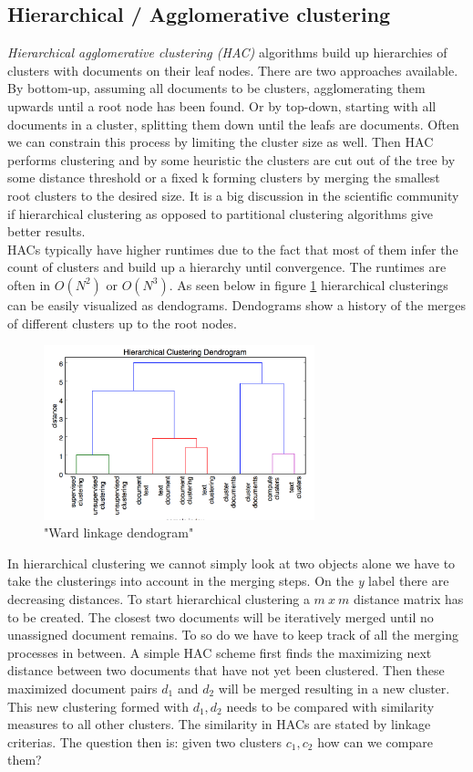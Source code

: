   \subsection{Hierarchical / Agglomerative clustering}
    \emph{Hierarchical agglomerative clustering (HAC)} algorithms build up hierarchies of clusters with  documents on their leaf nodes. There are two approaches available. By bottom-up, assuming all documents to be clusters, agglomerating them upwards until a root node has been found. Or by top-down, starting with all documents in a cluster, splitting them down until the leafs are documents. Often we can constrain this process by limiting the cluster size as well. Then HAC performs clustering and by some heuristic the clusters are cut out of the tree by some distance threshold or a fixed k forming clusters by merging the smallest root clusters to the desired size. It is a big discussion in the scientific community if hierarchical clustering as opposed to partitional clustering algorithms give better results. \cite{Nothing}\\
    HACs typically have higher runtimes due to the fact that most of them infer the count of clusters and build up a hierarchy until convergence. The runtimes are often in $O(N^2)$ or $O(N^3)$. As seen below in figure \ref{hac_dendogram} hierarchical clusterings can be easily visualized as dendograms. Dendograms show a history of the merges of different clusters up to the root nodes.

    \begin{figure}[h!]
      \centering
        \includegraphics[width=0.7\textwidth]{dendogram.png}
        \caption{"Ward linkage dendogram"}
        \label{hac_dendogram}
    \end{figure}

    In hierarchical clustering we cannot simply look at two objects alone we have to take the clusterings into account in the merging steps. On the \emph{y} label there are decreasing distances. To start hierarchical clustering a $m\:x\:m$ distance matrix has to be created. The closest two documents will be iteratively merged until no unassigned document remains. To so do we have to keep track of all the merging processes in between. A simple HAC scheme first finds the maximizing next distance between two documents that have not yet been clustered. Then these maximized document pairs $d_1$ and $d_2$ will be merged resulting in a new cluster. This new clustering formed with $d_1,d_2$ needs to be compared with similarity measures to all other clusters. The similarity in HACs are stated by linkage criterias. The question then is: given two clusters $c_1,c_2$ how can we compare them?

